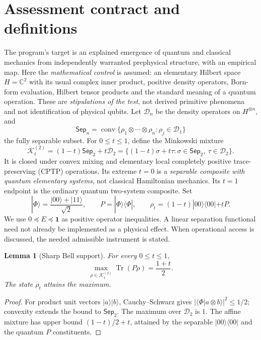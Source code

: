 \documentclass[10pt,letterpaper]{article}
\newtheorem{lemma}[theorem]{Lemma}
\newcommand{\DD}{\mathcal D}
\newcommand{\SSep}{\mathsf{Sep}}
\newcommand{\KK}{\mathcal K}
\newcommand{\tr}{\operatorname{Tr}}
\newcommand{\id}{\mathbf 1}
\newcommand{\C}{\mathbb C}
\begin{document}
\section{Assessment contract and definitions}
The program's target is an explained emergence of quantum and classical mechanics
from independently warranted prephysical structure, with an empirical map.
Here the \emph{mathematical control} is assumed: an elementary Hilbert space
$H=\C^2$ with its usual complex inner product, positive density operators,
Born-form evaluation, Hilbert tensor products and the standard meaning of a
quantum operation. These are \emph{stipulations of the test}, not derived
primitive phenomena and not identification of physical qubits.
Let $\DD_n$ be the density operators on $H^{\otimes n}$, and
\[
\SSep_n=\operatorname{conv}\{\rho_1\otimes\cdots\otimes\rho_n:
\rho_j\in\DD_1\}
\]
the fully separable subset. For $0\le t\le1$, define the Minkowski mixture
\begin{equation}\label{eq:K}
\KK_t^{(2)}=(1-t)\SSep_2+t\DD_2
=\{(1-t)\sigma+t\tau:\sigma\in\SSep_2,\ \tau\in\DD_2\}.
\end{equation}
It is closed under convex mixing and elementary local completely positive
trace-preserving (CPTP) operations. Its extreme $t=0$ is a \emph{separable
composite with quantum elementary systems}, not classical Hamiltonian mechanics.
Its $t=1$ endpoint is the ordinary quantum two-system composite.
Set
\[
|\Phi\rangle=\frac{|00\rangle+|11\rangle}{\sqrt2},\qquad
P=|\Phi\rangle\langle\Phi|,\qquad
\rho_t=(1-t)|00\rangle\langle00|+tP.
\]
We use $0\preceq E\preceq\id$ as positive operator inequalities. A linear
separation functional need not already be implemented as a physical effect.
When operational access is discussed, the needed admissible instrument is stated.

\begin{lemma}[Sharp Bell support]\label{lem:support}
For every $0\le t\le1$,
\[
\max_{\rho\in\KK_t^{(2)}}\tr(P\rho)=\frac{1+t}{2}.
\]
The state $\rho_t$ attains the maximum.
\end{lemma}
\begin{proof}
For product unit vectors $|a\rangle|b\rangle$, Cauchy--Schwarz gives
$|\langle\Phi|a\otimes b\rangle|^2\le1/2$; convexity extends the
bound to $\SSep_2$. The maximum over $\DD_2$ is $1$.
The affine mixture has upper bound $(1-t)/2+t$, attained by the
separable $|00\rangle\langle00|$ and the quantum $P$ constituents.
\end{proof}
\end{document}
